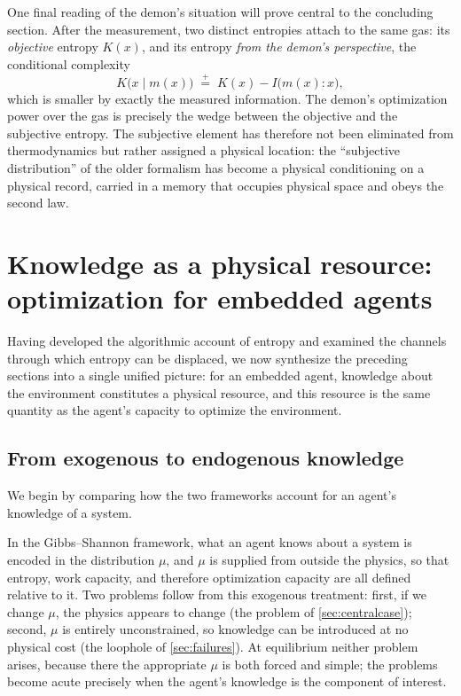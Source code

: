 \documentclass[11pt]{article}
\newcommand{\peq}{\mathrel{\stackrel{+}{=}}}
\begin{document}
One final reading of the demon's situation will prove central to the concluding section. After the measurement, two distinct entropies attach to the same gas: its \emph{objective} entropy $K(x)$, and its entropy \emph{from the demon's perspective}, the conditional complexity
\[
K\big(x \mid m(x)\big) \;\peq\; K(x) - I\big(m(x) : x\big),
\]
which is smaller by exactly the measured information. The demon's optimization power over the gas is precisely the wedge between the objective and the subjective entropy. The subjective element has therefore not been eliminated from thermodynamics but rather assigned a physical location: the ``subjective distribution'' of the older formalism has become a physical conditioning on a physical record, carried in a memory that occupies physical space and obeys the second law.
\section{Knowledge as a physical resource: optimization for embedded agents}
\label{sec:embedded}

Having developed the algorithmic account of entropy and examined the channels through which entropy can be displaced, we now synthesize the preceding sections into a single unified picture: for an embedded agent, knowledge about the environment constitutes a physical resource, and this resource is the same quantity as the agent's capacity to optimize the environment.

\subsection{From exogenous to endogenous knowledge}
\label{sec:endogenous}

We begin by comparing how the two frameworks account for an agent's knowledge of a system.

In the Gibbs--Shannon framework, what an agent knows about a system is encoded in the distribution $\mu$, and $\mu$ is supplied from outside the physics, so that entropy, work capacity, and therefore optimization capacity are all defined relative to it. Two problems follow from this exogenous treatment: first, if we change $\mu$, the physics appears to change (the problem of \cref{sec:centralcase}); second, $\mu$ is entirely unconstrained, so knowledge can be introduced at no physical cost (the loophole of \cref{sec:failures}). At equilibrium neither problem arises, because there the appropriate $\mu$ is both forced and simple; the problems become acute precisely when the agent's knowledge is the component of interest.
\end{document}
